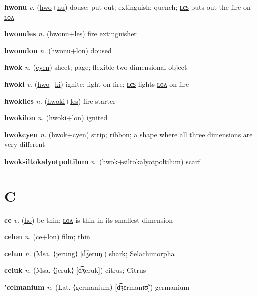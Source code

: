 \textbf{\hypertarget{hwonu}{hwonu}} \textit{v.} (\hyperlink{hwo}{hwo}+\allowbreak \hyperlink{nu}{nu})
douse; put out; extinguish; quench; \hyperlink{hwonules}{ʟєꜱ} puts out the fire on \hyperlink{hwonulon}{ʟᴏᴧ}

\textbf{\hypertarget{hwonules}{hwonules}} \textit{n.} (\hyperlink{hwonu}{hwonu}+\allowbreak \hyperlink{les}{les})
fire extinguisher

\textbf{\hypertarget{hwonulon}{hwonulon}} \textit{n.} (\hyperlink{hwonu}{hwonu}+\allowbreak \hyperlink{lon}{lon})
doused

\textbf{\hypertarget{hwok}{hwok}} \textit{n.} (\hyperlink{cyen}{\sout{cyen}})
sheet; page; flexible two-dimensional object

\textbf{\hypertarget{hwoki}{hwoki}} \textit{v.} (\hyperlink{hwo}{hwo}+\allowbreak \hyperlink{ki}{ki})
ignite; light on fire; \hyperlink{hwokiles}{ʟєꜱ} lights \hyperlink{hwokilon}{ʟᴏᴧ} on fire

\textbf{\hypertarget{hwokiles}{hwokiles}} \textit{n.} (\hyperlink{hwoki}{hwoki}+\allowbreak \hyperlink{les}{les})
fire starter

\textbf{\hypertarget{hwokilon}{hwokilon}} \textit{n.} (\hyperlink{hwoki}{hwoki}+\allowbreak \hyperlink{lon}{lon})
ignited

\textbf{\hypertarget{hwokcyen}{hwokcyen}} \textit{n.} (\hyperlink{hwok}{hwok}+\allowbreak \hyperlink{cyen}{cyen})
strip; ribbon; a shape where all three dimensions are very different

\textbf{\hypertarget{hwoksiltokalyotpoltilum}{hwoksiltokalyotpoltilum}} \textit{n.} (\hyperlink{hwok}{hwok}+\allowbreak \hyperlink{siltokalyotpoltilum}{siltokalyotpoltilum})
scarf

\section{C}

\textbf{\hypertarget{ce}{ce}} \textit{v.} (\hyperlink{ho}{\sout{ho}})
be thin; \hyperlink{celon}{ʟᴏᴧ} is thin in its smallest dimension

\textbf{\hypertarget{celon}{celon}} \textit{n.} (\hyperlink{ce}{ce}+\allowbreak \hyperlink{lon}{lon})
film; thin

\textbf{\hypertarget{celun}{celun}} \textit{n.} (Msa. ⟨jerung⟩ [d͡ʒeruŋ])
shark; Selachimorpha

\textbf{\hypertarget{celuk}{celuk}} \textit{n.} (Msa. ⟨jeruk⟩ [d͡ʒeruk])
citrus; Citrus

\textbf{\hypertarget{'celmanium}{'celmanium}} \textit{n.} (Lat. ⟨germanium⟩ [d͡ʒɛrmanɪʊ̃])
germanium

